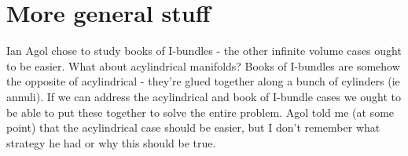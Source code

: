 \documentclass[12pt]{amsart}
\theoremstyle{definition}
\begin{document}
\section{More general stuff}

Ian Agol chose to study books of I-bundles - the other infinite volume cases
ought to be easier. What about acylindrical manifolds? Books of I-bundles are
somehow the opposite of acylindrical - they're glued together along a bunch of
cylinders (ie annuli). If we can address the acylindrical and book of I-bundle
cases we ought to be able to put these together to solve the entire problem.
Agol told me (at some point) that the acylindrical case should be easier, but
I don't remember what strategy he had or why this should be true.




\end{document}
